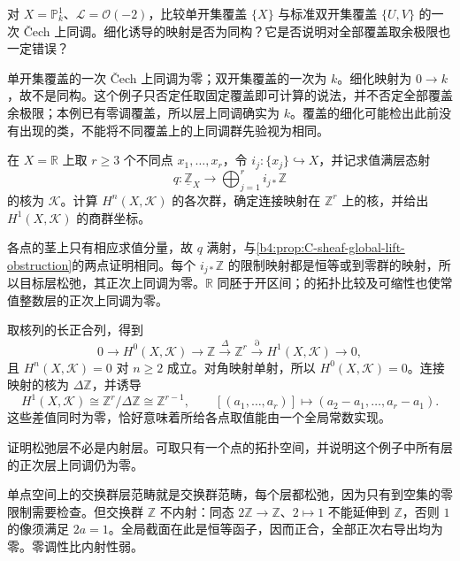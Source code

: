 \begin{exercise}\label{b4:ex:C-cover-refinement}
	对 \(X=\mathbb P^1_k\)、\(\mathcal L=\mathcal O(-2)\)，比较单开集覆盖 \(\{X\}\) 与标准双开集覆盖 \(\{U,V\}\) 的一次 Čech 上同调。细化诱导的映射是否为同构？它是否说明对全部覆盖取余极限也一定错误？
\end{exercise}
\begin{solution}
	单开集覆盖的一次 Čech 上同调为零；双开集覆盖的一次为 \(k\)。细化映射为 \(0\rightarrow k\)，故不是同构。这个例子只否定任取固定覆盖即可计算的说法，并不否定全部覆盖余极限；本例已有零调覆盖，所以层上同调确实为 \(k\)。覆盖的细化可能检出此前没有出现的类，不能将不同覆盖上的上同调群先验视为相同。
\end{solution}

\begin{exercise}\label{b4:ex:C-surjective-sheaf-map}
	在 \(X=\mathbb R\) 上取 \(r\ge3\) 个不同点 \(x_1,\ldots,x_r\)，令 \(i_j:\{x_j\}\hookrightarrow X\)，并记求值满层态射
	\[
		q:\underline{\mathbb Z}_X\longrightarrow\bigoplus_{j=1}^r i_{j*}\mathbb Z
	\]
	的核为 \(\mathcal K\)。计算 \(H^n(X,\mathcal K)\) 的各次群，确定连接映射在 \(\mathbb Z^r\) 上的核，并给出 \(H^1(X,\mathcal K)\) 的商群坐标。
\end{exercise}
\begin{solution}
	各点的茎上只有相应求值分量，故 \(q\) 满射，与\cref{b4:prop:C-sheaf-global-lift-obstruction}的两点证明相同。每个 \(i_{j*}\mathbb Z\) 的限制映射都是恒等或到零群的映射，所以目标层松弛，其正次上同调为零。\(\mathbb R\) 同胚于开区间；的拓扑比较及可缩性也使常值整数层的正次上同调为零。

	取核列的长正合列，得到
	\[
		0\longrightarrow H^0(X,\mathcal K)\longrightarrow\mathbb Z \xrightarrow{\Delta}\mathbb Z^r \xrightarrow{\partial}H^1(X,\mathcal K)\longrightarrow0,
	\]
	且 \(H^n(X,\mathcal K)=0\) 对 \(n\ge2\) 成立。对角映射单射，所以 \(H^0(X,\mathcal K)=0\)。连接映射的核为 \(\Delta\mathbb Z\)，并诱导
	\[
		H^1(X,\mathcal K)\cong\mathbb Z^r/\Delta\mathbb Z \cong\mathbb Z^{r-1},\qquad [(a_1,\ldots,a_r)]\longmapsto(a_2-a_1,\ldots,a_r-a_1).
	\]
	这些差值同时为零，恰好意味着所给各点取值能由一个全局常数实现。
\end{solution}

\begin{exercise}\label{b4:ex:C-flasque-not-injective}
	证明松弛层不必是内射层。可取只有一个点的拓扑空间，并说明这个例子中所有层的正次层上同调仍为零。
\end{exercise}
\begin{solution}
	单点空间上的交换群层范畴就是交换群范畴，每个层都松弛，因为只有到空集的零限制需要检查。但交换群 \(\mathbb Z\) 不内射：同态 \(2\mathbb Z\rightarrow\mathbb Z\)、\(2\mapsto1\) 不能延伸到 \(\mathbb Z\)，否则 \(1\) 的像须满足 \(2a=1\)。全局截面在此是恒等函子，因而正合，全部正次右导出均为零。零调性比内射性弱。
\end{solution}

